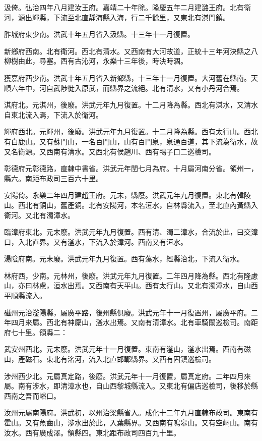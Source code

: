 汲倚。弘治四年八月建汝王府。嘉靖二十年除。隆慶五年二月建潞王府。北有衛河，源出輝縣，下流至北直靜海縣入海，行二千餘里，又東北有淇門鎮。

胙城府東少南。洪武十年五月省入汲縣。十三年十一月復置。

新鄉府西南。北有衛河。西北有清水。又西南有大河故道，正統十三年河決縣之八柳樹由此，尋塞。西有古沁河，永樂十三年後，時決時涸。

獲嘉府西少南。洪武十年五月省入新鄉縣，十三年十一月復置。大河舊在縣南。天順六年中，河自武陟徙入原武，而縣界之流絕。北有清水，又有小丹河合焉。

淇府北。元淇州，後廢。洪武元年九月復置。十二月降為縣。西北有淇水，又清水自東北流入焉，下流入於衛河。

輝府西北。元輝州，後廢。洪武元年九月復置。十二月降為縣。西有太行山。西北有白鹿山。又有蘇門山，一名百門山，山有百門泉，泉通百道，其下流為衛水，故又名衛源。又西南有清水。又西北有侯趙川、西有鴨子口二巡檢司。

彰德府元彰德路，直隸中書省。洪武元年閏七月為府。十月屬河南分省。領州一，縣六。南距布政司三百六十里。

安陽倚。永樂二年四月建趙王府。元末，縣廢。洪武元年九月復置。東北有韓陵山。西北有銅山，舊產銅。北有安陽河，本名洹水，自林縣流入，至北直內黃縣入衛河。又北有濁漳水。

臨漳府東北。元末廢。洪武元年九月復置。西有清、濁二漳水，合流於此，曰交漳口，入北直界。又有滏水，下流入於漳河。西南又有洹水。

湯陰府南。元末廢。洪武元年九月復置。西有蕩水，經縣治北，下流入衛水。

林府西，少南。元林州，後廢。洪武元年九月復置。二年四月降為縣。西北有隆慮山，亦曰林慮，洹水出焉。又西南有天平山。西有太行山。又北有濁漳水，自山西平順縣流入。

磁州元治滏陽縣，屬廣平路，後州縣俱廢。洪武元年十一月復置州，屬廣平府。二年四月來屬。西北有神麇山，滏水出焉。又南有清漳水。北有車騎關巡檢司。南距府七十里。領縣二：

武安州西北。元末廢。洪武元年十一月復置。東南有滏山，滏水出焉。西南有磁山，產磁石。東北有洺河，流入北直邯鄲縣界。又西有固鎮巡檢司。

涉州西少北。元屬真定路，後廢。洪武元年十一月復置，屬真定府。二年四月來屬。南有涉水，即清漳水也，自山西黎城縣流入。又東北有偏店巡檢司，後移於縣西南之吾而峪口。

汝州元屬南陽府。洪武初，以州治梁縣省入。成化十二年九月直隸布政司。東南有霍山。又有魚齒山，涉水出於此，入葉縣界。又西南有鳴皋山。又有空峒山。南有汝水。西有廣成澤。領縣四。東北距布政司四百九十里。

